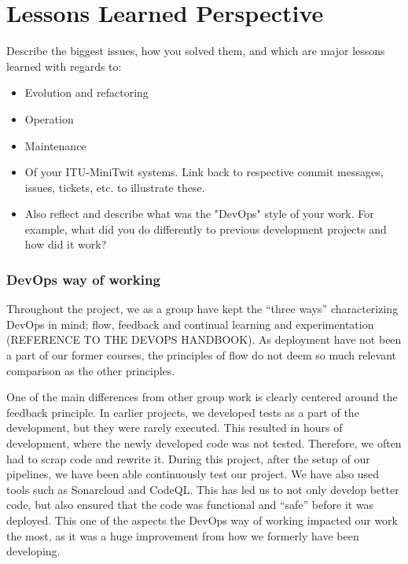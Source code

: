 \section{Lessons Learned Perspective}

Describe the biggest issues, how you solved them, and which are major lessons learned with regards to:
\begin{itemize}
  \item Evolution and refactoring
  \item Operation
  \item Maintenance
  \item Of your ITU-MiniTwit systems. Link back to respective commit messages, issues, tickets, etc. to illustrate these.
  \item Also reflect and describe what was the "DevOps" style of your work. For example, what did you do differently to previous development projects and how did it work?

\end{itemize}

\subsubsection{DevOps way of working}

Throughout the project, we as a group have kept the “three ways” characterizing DevOps in mind; flow, feedback and continual learning and experimentation (REFERENCE TO THE DEVOPS HANDBOOK). As deployment have not been a part of our former courses, the principles of flow do not deem so much relevant comparison as the other principles.

One of the main differences from other group work is clearly centered around the feedback principle. In earlier projects, we developed tests as a part of the development, but they were rarely executed. This resulted in hours of development, where the newly developed code was not tested. Therefore, we often had to scrap code and rewrite it. During this project, after the setup of our pipelines, we have been able continuously test our project. We have also used tools such as Sonarcloud and CodeQL. This has led us to not only develop better code, but also ensured that the code was functional and “safe” before it was deployed. This one of the aspects the DevOps way of working impacted our work the most, as it was a huge improvement from how we formerly have been developing.